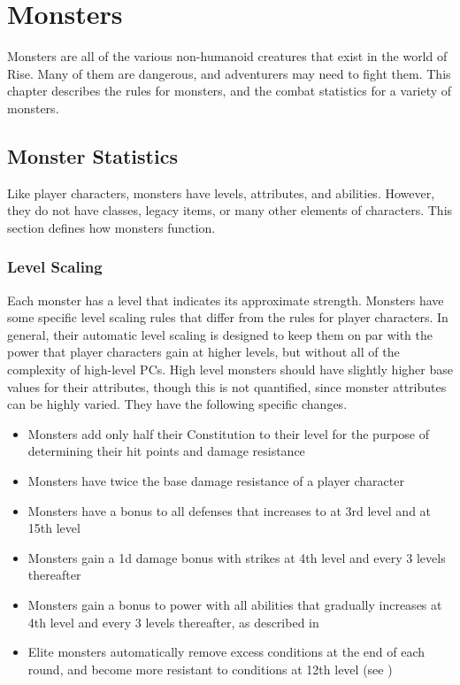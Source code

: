 \chapter{Monsters}

Monsters are all of the various non-humanoid creatures that exist in the world of Rise.
Many of them are dangerous, and adventurers may need to fight them.
This chapter describes the rules for monsters, and the combat statistics for a variety of monsters.

\section{Monster Statistics}
    Like player characters, monsters have levels, attributes, and abilities.
    However, they do not have classes, legacy items, or many other elements of characters.
    This section defines how monsters function.

    \subsection{Level Scaling}
        Each monster has a level that indicates its approximate strength.
        Monsters have some specific level scaling rules that differ from the rules for player characters.
        In general, their automatic level scaling is designed to keep them on par with the power that player characters gain at higher levels, but without all of the complexity of high-level PCs.
        High level monsters should have slightly higher base values for their attributes, though this is not quantified, since monster attributes can be highly varied.
        They have the following specific changes.
        \begin{itemize}
            \item Monsters add only half their Constitution to their level for the purpose of determining their hit points and damage resistance
            \item Monsters have twice the base damage resistance of a player character
            \item Monsters have a  bonus to all defenses that increases to  at 3rd level and  at 15th level
            \item Monsters gain a \plus1d damage bonus with strikes at 4th level and every 3 levels thereafter
            \item Monsters gain a  bonus to power with all abilities that gradually increases at 4th level and every 3 levels thereafter, as described in 
            \item Elite monsters automatically remove excess conditions at the end of each round, and become more resistant to conditions at 12th level (see )
        \end{itemize}

